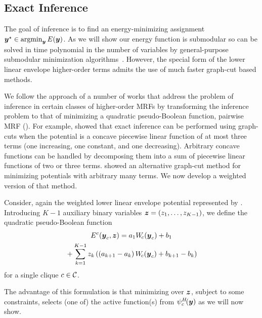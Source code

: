 \documentclass[10pt,journal,letterpaper,compsoc]{IEEEtran}
\renewcommand{\citename}{\citet}
\renewcommand{\cite}{\citep}
\begin{document}
\subsection{Exact Inference}
\label{sec:exact_inference}

The goal of inference is to find an energy-minimizing assignment
${\boldsymbol{y}}^\star \in \mathop{\textrm{argmin}}_{{\boldsymbol{y}}} E\!\left({\boldsymbol{y}}\right)$. As we will show our energy
function is submodular so can be solved in time polynomial in the
number of variables by general-purpose submodular minimization
algorithms~\cite{Kolmogorov:DAM12, Orlin:MP2009}. However, the special
form of the lower linear envelope higher-order terms admits the use of
much faster graph-cut based methods. 

We follow the approach of a number of works that address the problem
of inference in certain classes of higher-order MRFs by transforming
the inference problem to that of minimizing a quadratic pseudo-Boolean
function, \ie pairwise MRF (\eg\cite{Freedman:CVPR05, Ishikawa:CVPR09,
  Boros:MATH02}). For example, \citename{Kohli:TR08} showed that exact
inference can be performed using graph-cuts when the potential is a
concave piecewise linear function of at most three terms (one
increasing, one constant, and one decreasing). Arbitrary concave
functions can be handled by decomposing them into a sum of piecewise
linear functions of two or three terms. \citename{Gould:ICML2011}
showed an alternative graph-cut method for minimizing potentials with
arbitrary many terms. We now develop a weighted version of that
method.

Consider, again the weighted lower linear envelope potential
represented by . Introducing $K-1$ auxiliary
binary variables ${\boldsymbol{z}} = \left(z_1, \ldots, z_{K-1}\right)$, we define
the quadratic pseudo-Boolean function
%
\begin{multline}
  E^c(\by_c, \bz) = a_1 W_{\!c}(\by_c) + b_1 \\
  {}+ \sum_{k = 1}^{K-1} z_k \left( \left(a_{k+1} - a_k\right) W_{\!c}(\by_c) + b_{k+1} - b_k \right)
  \label{eqn:binary_concave_z}
\end{multline}
%
for a single clique $c \in \C$.

The advantage of this formulation is that minimizing over ${\boldsymbol{z}}$,
subject to some constraints, selects (one of) the active function(s)
from $\psi^H_c\!({\boldsymbol{y}})$ as we will now show.
\end{document}
